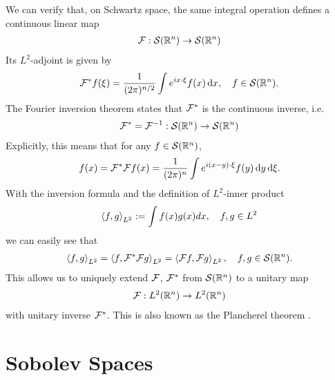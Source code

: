 \documentclass[12pt]{article}
\begin{document}
We can verify that, on Schwartz space, the same integral operation defines a continuous linear map 
\begin{align*}
\F : \sch(\R^n) \to \sch(\R^n)
\end{align*}
Its $L^2$-adjoint is given by 
\begin{align*}
\F^* f(\xi) = \frac{1}{(2\pi)^{n/2}} \int e^{i x \cdot \xi} f(x)\d[x], \quad f \in \sch(\R^n). 
\end{align*}
The Fourier inversion theorem states that $\F^* $ is the continuous inverse, i.e. 
\begin{align}
\F^* = \F^{-1} : \sch(\R^n) \to \sch(\R^n) \label{eq: fourier inversion} 
\end{align}
Explicitly, this means that for any $f \in \sch(\R^n)$, 
\begin{align*}
f(x) = \F^* \F f (x) = \frac{1}{(2\pi)^n} \int e^{i(x - y) \cdot \xi} f(y) \d[y] \d[\xi]. 
\end{align*}
With the inversion formula and the definition of $L^2$-inner product
\begin{align*}
\inprod[f, g]_{L^2} := \int f(x) g(x) dx , \quad f, g \in L^2
\end{align*}
we can easily see that 
\begin{align*}
\inprod[f, g]_{L^2} = \inprod[f, \F^* \F g]_{L^2} = \inprod[\F f, \F g]_{L^2}, \quad f, g \in \sch(\R^n). 
\end{align*}
This allows us to uniquely extend $\F$, $\F^*$ from $\sch(\R^n)$ to a unitary map 
\begin{align*}
\F : L^2(\R^n) \to L^2(\R^n)
\end{align*}
with unitary  inverse $\F^*$. This is also known as the Plancherel theorem \cite{taylor_pde}. 



\section{Sobolev Spaces }
\end{document}
